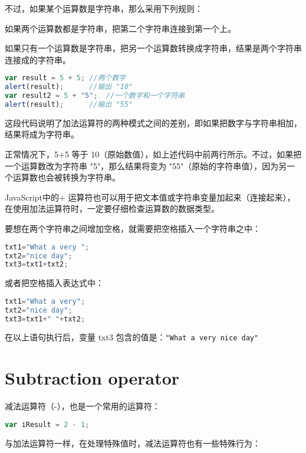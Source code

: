 不过，如果某个运算数是字符串，那么采用下列规则：

\begin{compactitem}
\item 如果两个运算数都是字符串，把第二个字符串连接到第一个上。
\item 如果只有一个运算数是字符串，把另一个运算数转换成字符串，结果是两个字符串连接成的字符串。
\end{compactitem}

\begin{lstlisting}[language=JavaScript]
var result = 5 + 5;	//两个数字
alert(result);		//输出 "10"
var result2 = 5 + "5";	//一个数字和一个字符串
alert(result);		//输出 "55"
\end{lstlisting}

这段代码说明了加法运算符的两种模式之间的差别，即如果把数字与字符串相加，结果将成为字符串。


正常情况下，5+5 等于 10（原始数值），如上述代码中前两行所示。不过，如果把一个运算数改为字符串 "5"，那么结果将变为 "55"（原始的字符串值），因为另一个运算数也会被转换为字符串。

JavaScript中的+ 运算符也可以用于把文本值或字符串变量加起来（连接起来），在使用加法运算符时，一定要仔细检查运算数的数据类型。

要想在两个字符串之间增加空格，就需要把空格插入一个字符串之中：

\begin{lstlisting}[language=JavaScript]
txt1="What a very ";
txt2="nice day";
txt3=txt1+txt2;
\end{lstlisting}

或者把空格插入表达式中：

\begin{lstlisting}[language=JavaScript]
txt1="What a very";
txt2="nice day";
txt3=txt1+" "+txt2;
\end{lstlisting}

在以上语句执行后，变量 txt3 包含的值是：\verb|"What a very nice day"|

\section{Subtraction operator}


减法运算符（-），也是一个常用的运算符：

\begin{lstlisting}[language=JavaScript]
var iResult = 2 - 1;
\end{lstlisting}


与加法运算符一样，在处理特殊值时，减法运算符也有一些特殊行为：

